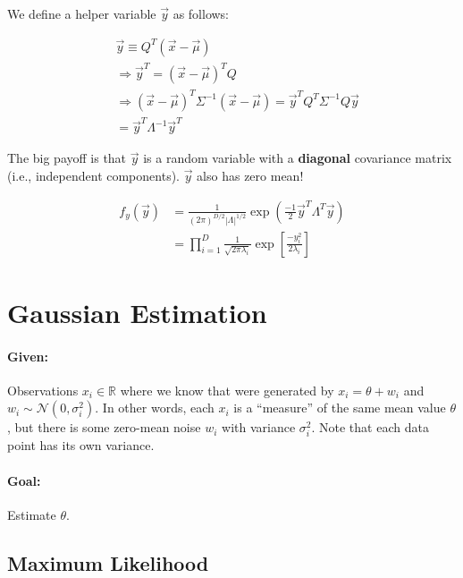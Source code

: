 \documentclass[a4paper,12pt]{report}
\begin{document}
We define a helper variable $\vec y$ as follows:

\begin{equation}
\begin{split}
& \vec y \equiv Q^T(\vec x - \vec \mu) \\
& \Rightarrow \vec y^T = (\vec x - \vec \mu)^T Q \\
& \Rightarrow (\vec x - \vec \mu)^T \Sigma^{-1} (\vec x - \vec \mu) = \vec y^T Q^T \Sigma^{-1} Q \vec y \\
&= \vec y^T \Lambda^{-1} \vec y^T
\end{split}
\end{equation}

The big payoff is that $\vec y$ is a random variable with a \textbf{diagonal} covariance matrix (i.e., independent components). $\vec y$ also has zero mean!

\begin{equation}
\begin{split}
f_y(\vec y) &= \frac{1}{(2\pi)^{D/2} |\Lambda|^{1/2}} \exp (\frac{-1}{2} \vec y^T \Lambda^T \vec y) \\
&= \prod_{i=1}^D \frac{1}{\sqrt{2\pi\lambda_i}} \exp[\frac{-y_i^2}{2\lambda_i}]
\end{split}
\end{equation}


\section{Gaussian Estimation}

\paragraph{Given: } Observations $x_i\in \mathbb R$ where we know that were generated by $x_i = \theta + w_i$ and $w_i \sim \mathcal N(0, \sigma_i^2)$. In other words, each $x_i$ is a ``measure'' of the same mean value $\theta$, but there is some zero-mean noise $w_i$ with variance $\sigma_i^2$. Note that each data point has its own variance. 

\paragraph{Goal: } Estimate $\theta$.

\subsection{Maximum Likelihood}
\end{document}
